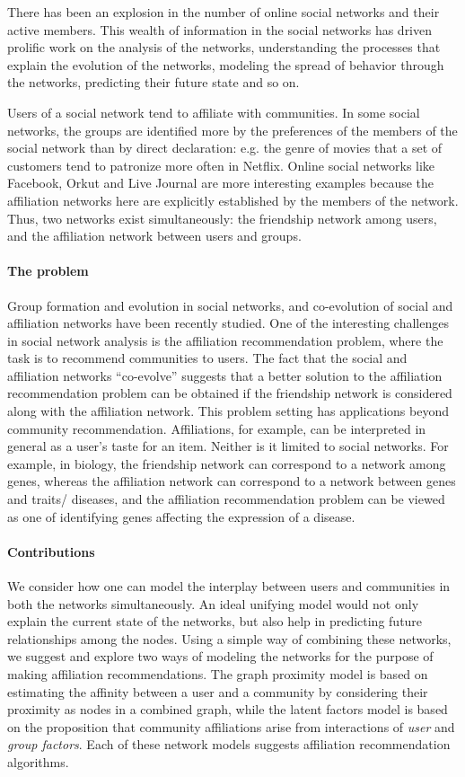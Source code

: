 There has been an explosion in the number of online social networks and their active members. This wealth of information in the social networks has driven prolific work on the analysis of the networks, understanding the processes that explain the evolution of the networks, modeling the spread of behavior through the networks, predicting their future state and so on.

Users of a social network tend to affiliate with communities. In some social networks, the groups are identified more by the preferences of the members of the social network than by direct declaration: e.g. the genre of movies that a set of customers tend to patronize more often in Netflix. Online social networks like Facebook, Orkut and Live Journal are more interesting examples because the affiliation networks here are explicitly established by the members of the network. Thus, two networks exist simultaneously: the friendship network among users, and the affiliation network between users and groups.

\paragraph*{The problem}
Group formation and evolution in social networks\cite{GroupFormation}, and co-evolution of social and affiliation networks\cite{Coevolution} have been recently studied. One of the interesting challenges in social network analysis is the affiliation recommendation problem, where the task is to recommend communities to users. The fact that the social and affiliation networks ``co-evolve'' suggests that a better solution to the affiliation recommendation problem can be obtained if the friendship network is considered along with the affiliation network. This problem setting has applications beyond community recommendation. Affiliations, for example, can be interpreted in general as a user's taste for an item. Neither is it limited to social networks. For example, in biology, the friendship network can correspond to a network among genes, whereas the affiliation network can correspond to a network between genes and traits/ diseases, and the affiliation recommendation problem can be viewed as one of identifying genes affecting the expression of a disease.

\paragraph*{Contributions}
We consider how one can model the interplay between users and communities in both the networks simultaneously. An ideal unifying model would not only explain the current state of the networks, but also help in predicting future relationships among the nodes. Using a simple way of combining these networks, we suggest and explore two ways of modeling the networks for the purpose of making affiliation recommendations. The graph proximity model is based on estimating the affinity between a user and a community by considering their proximity as nodes in a combined graph, while the latent factors model is based on the proposition that community affiliations arise from interactions of \textit{user} and \textit{group factors}. Each of these network models suggests affiliation recommendation algorithms.

